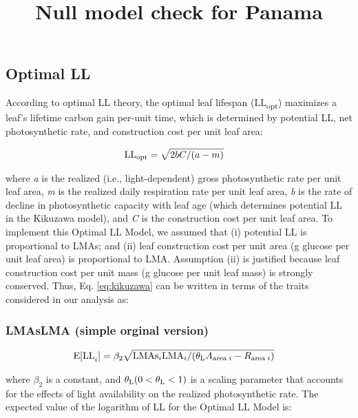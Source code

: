 \documentclass[12pt,]{article}
\title{Null model check for Panama}
\author{}
\date{}
\begin{document}
\maketitle

\subsection{Optimal LL}\label{optimal-ll}

According to optimal LL theory, the optimal leaf lifespan
(LL\textsubscript{opt}) maximizes a leaf's lifetime carbon gain per-unit
time, which is determined by potential LL, net photosynthetic rate, and
construction cost per unit leaf area:

\begin{align}
  &{\rm LL_{opt}} = \sqrt{2bC/(a-m)}\label{eq:kikuzawa}
\end{align}

where \emph{a} is the realized (i.e., light-dependent) gross
photosynthetic rate per unit leaf area, \emph{m} is the realized daily
respiration rate per unit leaf area, \emph{b} is the rate of decline in
photosynthetic capacity with leaf age (which determines potential LL in
the Kikuzawa model), and \emph{C} is the construction cost per unit leaf
area. To implement this Optimal LL Model, we assumed that (i) potential
LL is proportional to LMAs; and (ii) leaf construction cost per unit
area (g glucose per unit leaf area) is proportional to LMA. Assumption
(ii) is justified because leaf construction cost per unit mass (g
glucose per unit leaf mass) is strongly conserved. Thus, Eq.
\eqref{eq:kikuzawa} can be written in terms of the traits considered in
our analysis as:

\subsubsection{LMAsLMA (simple orginal
version)}\label{lmaslma-simple-orginal-version}

\begin{align}
  {\rm E[LL}_{i}] &=\beta_{2} \sqrt{{\rm LMAs}_{i}{\rm LMA}_{i}
  / (\theta_{\rm L} A_{{\rm area} \; i} - R_{{\rm area} \; i})}\label{eq:simple}
\end{align}

where \(\beta_{2}\) is a constant, and
\(\theta_{\rm L} (0 < \theta_{\rm L} < 1)\) is a scaling parameter that
accounts for the effects of light availability on the realized
photosynthetic rate. The expected value of the logarithm of LL for the
Optimal LL Model is:
\end{document}
